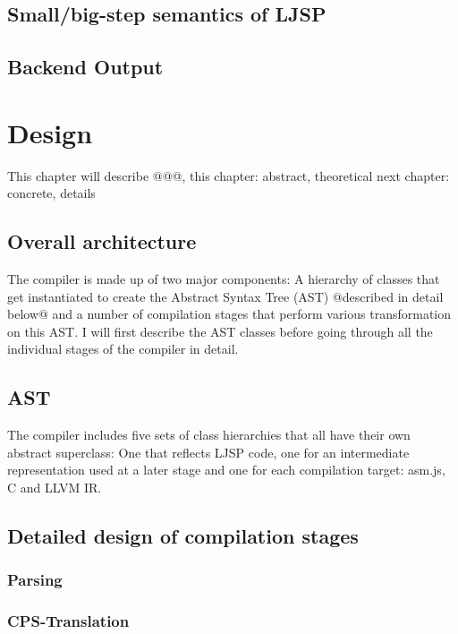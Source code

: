 \documentclass[11pt]{report}
\begin{document}
\section{Small/big-step semantics of LJSP}
\section{Backend Output}

\chapter{Design}
This chapter will describe @@@, this chapter: abstract, theoretical next chapter: concrete, details
\section{Overall architecture}
The compiler is made up of two major components: A hierarchy of classes that get instantiated to create the Abstract Syntax Tree (AST) @described in detail below@ and a number of compilation stages that perform various transformation on this AST. I will first describe the AST classes before going through all the individual stages of the compiler in detail.
\section{AST}
The compiler includes five sets of class hierarchies that all have their own abstract superclass: One that reflects LJSP code, one for an intermediate representation used at a later stage and one for each compilation target: asm.js, C and LLVM IR.
\section{Detailed design of compilation stages}
\subsection{Parsing}
\subsection{CPS-Translation}
\end{document}
